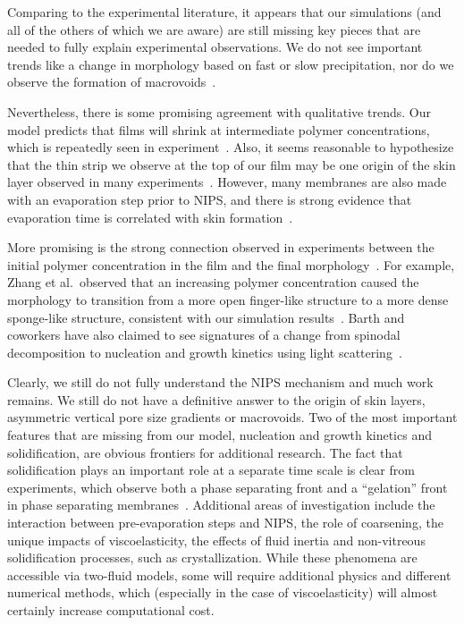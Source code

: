 \documentclass[journal=mamobx, layout=twocolumn]{achemso}
\begin{document}
Comparing to the experimental literature, it appears that our simulations (and all of the others of which we are aware) are still missing key pieces that are needed to fully explain experimental observations.
We do not see important trends like a change in morphology based on fast or slow precipitation, nor do we observe the formation of macrovoids~\cite{Tree2018}.

Nevertheless, there is some promising agreement with qualitative trends.
Our model predicts that films will shrink at intermediate polymer concentrations, which is repeatedly seen in experiment~\cite{Udoh2016}.
Also, it seems reasonable to hypothesize that the thin strip we observe at the top of our film may be one origin of the skin layer observed in many experiments~\cite{Strathmann1975, Smolders1992}.
However, many membranes are also made with an evaporation step prior to NIPS, and there is strong evidence that evaporation time is correlated with skin formation~\cite{Strathmann1975,Holda2013}.

More promising is the strong connection observed in experiments between the initial polymer concentration in the film and the final morphology~\cite{McHugh1992, Gaides1992, Barth2000, Su2009, Zhang2016h, Udoh2016}.
For example, Zhang et al.\ observed that an increasing polymer concentration caused the morphology to transition from a more open finger-like structure to a more dense sponge-like structure, consistent with our simulation results~\cite{Zhang2016h}.
Barth and coworkers have also claimed to see signatures of a change from spinodal decomposition to nucleation and growth kinetics using light scattering~\cite{Barth2000}.

Clearly, we still do not fully understand the NIPS mechanism and much work remains.
We still do not have a definitive answer to the origin of skin layers, asymmetric vertical pore size gradients or macrovoids.
Two of the most important features that are missing from our model, nucleation and growth kinetics and solidification, are obvious frontiers for additional research.
The fact that solidification plays an important role at a separate time scale is clear from experiments, which observe both a phase separating front and a ``gelation'' front in phase separating membranes~\cite{McHugh1992,McHugh1995a}.
Additional areas of investigation include the interaction between pre-evaporation steps and NIPS, the role of coarsening, the unique impacts of viscoelasticity, the effects of fluid inertia and non-vitreous solidification processes, such as crystallization.
While these phenomena are accessible via two-fluid models, some will require additional physics and different numerical methods, which (especially in the case of viscoelasticity) will almost certainly increase computational cost.
\end{document}
